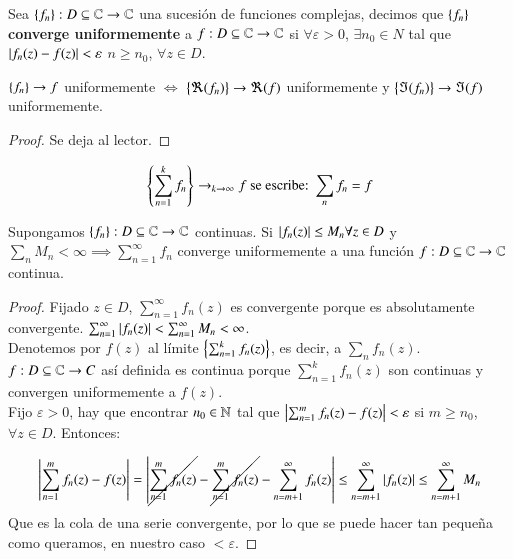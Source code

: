     \begin{dfn}
        Sea $\left\{f_n\right\} : D \subseteq \mathbb{C} \to \mathbb{C}$ una sucesión de funciones complejas, decimos que $\left\{f_n\right\}$ \textbf{converge uniformemente} a $f: D \subseteq \mathbb{C} \to \mathbb{C}$ si $\forall \varepsilon > 0$, $\exists n_0 \in N$ tal que $\left|f_n(z) - f(z)\right| < \varepsilon$ $n \geq n_0$, $\forall z \in  D$.
    \end{dfn}

    \begin{pro}
        $\left\{f_n\right\} \to f$ uniformemente $\iff$ $\left\{\Re(f_n)\right\} \to \Re(f)$ uniformemente y $\left\{\Im(f_n)\right\} \to \Im(f)$ uniformemente.
    \end{pro}

    \begin{proof}
        Se deja al lector.
    \end{proof}

    \begin{obs}[Notación]
        $$
            \left\{\sum_{n=1}^{k} f_n\right\} \to_{k\to\infty} f \text{ se escribe: } \sum_{n} f_n = f
        $$
    \end{obs}

    \begin{pro}[M-test]
        Supongamos $\left\{f_n\right\}: D \subseteq \mathbb{C} \to \mathbb{C}$ continuas. Si $\left|f_n(z)\right| \leq M_n \forall z \in D$ y $\sum_n M_n < \infty \implies \sum_{n=1}^{\infty} f_n$ converge uniformemente a una función $f: D\subseteq \mathbb{C} \to \mathbb{C}$ continua.
    \end{pro}

    \begin{proof}
        Fijado $z \in D$, $\sum_{n=1}^{\infty} f_n(z)$ es convergente porque es absolutamente convergente. $\sum_{n=1}^{\infty} \left|f_n(z)\right| < \sum_{n=1}^{\infty} M_n < \infty$.\\
        Denotemos por $f(z)$ al límite $\left\{\sum_{n=1}^{k} f_n(z)\right\}$, es decir, a $\sum_n f_n(z)$. $f: D \subseteq \mathbb{C} \to C$ así definida es continua porque $\sum_{n=1}^k f_n(z)$ son continuas y convergen uniformemente a $f(z)$.\\
        Fijo $\varepsilon > 0$, hay que encontrar $n_0 \in \mathbb{N}$ tal que $\left|\sum_{n=1}^m f_n(z) - f(z)\right| < \varepsilon$ si $m \geq n_0$, $\forall z \in D$. Entonces:

        $$
            \left|\sum_{n=1}^m f_n(z) - f(z)\right| = \left| \cancel{\sum_{n=1}^{m} f_n(z)} - \cancel{\sum_{n=1}^{m} f_n(z)} - \sum_{n=m+1}^\infty f_n(z)\right| \leq \sum_{n=m+1}^{\infty} \left|f_n(z)\right| \leq \sum_{n=m+1}^{\infty} M_n
        $$
        Que es la cola de una serie convergente, por lo que se puede hacer tan pequeña como queramos, en nuestro caso $< \varepsilon$.
    \end{proof}

